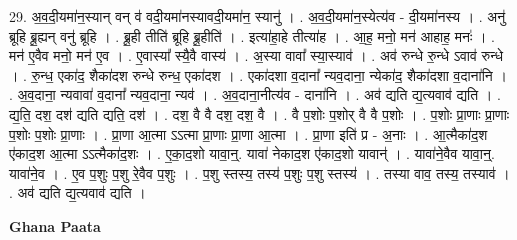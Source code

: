 \documentclass[17pt]{extarticle}
\begin{document}
29. अ॒व॒दी॒यमा॑न॒स्यान् वन् व॑ वदी॒यमा॑नस्यावदी॒यमा॑न॒ स्यानु॑ । . अ॒व॒दी॒यमा॑न॒स्येत्य॑व - दी॒यमा॑नस्य । . अनु॑ ब्रूहि ब्रू॒ह्यन् वनु॑ ब्रूहि । . ब्रू॒ही तीति॑ ब्रूहि ब्रू॒हीति॑ । . इत्या॑हा॒हे तीत्या॑ह । . आ॒ह॒ मनो॒ मन॑ आहाह॒ मनः॑ । . मन॑ ए॒वैव मनो॒ मन॑ ए॒व । . ए॒वास्या᳚ स्यै॒वै वास्य॑ । . अ॒स्या वावा᳚ स्या॒स्याव॑ । . अव॑ रुन्धे रु॒न्धे ऽवाव॑ रुन्धे । . रु॒न्ध॒ एका॑द॒ शैका॑दश रुन्धे रुन्ध॒ एका॑दश । . एका॑दशा व॒दाना᳚ न्यव॒दाना॒ न्येका॑द॒ शैका॑दशा व॒दाना॑नि । . अ॒व॒दाना॒ न्यवावा॑ व॒दाना᳚ न्यव॒दाना॒ न्यव॑ । . अ॒व॒दाना॒नीत्य॑व - दाना॑नि । . अव॑ द्यति द्य॒त्यवाव॑ द्यति । . द्य॒ति॒ दश॒ दश॑ द्यति द्यति॒ दश॑ । . दश॒ वै वै दश॒ दश॒ वै । . वै प॒शोः प॒शोर् वै वै प॒शोः । . प॒शोः प्रा॒णाः प्रा॒णाः प॒शोः प॒शोः प्रा॒णाः । . प्रा॒णा आ॒त्मा ऽऽत्मा प्रा॒णाः प्रा॒णा आ॒त्मा । . प्रा॒णा इति॑ प्र - अ॒नाः । . आ॒त्मैका॑द॒श ए॑काद॒श आ॒त्मा ऽऽत्मैका॑द॒शः । . ए॒का॒द॒शो यावा॒न्॒. यावा॑ नेकाद॒श ए॑काद॒शो यावान्॑ । . यावा॑ने॒वैव यावा॒न्॒. यावा॑ने॒व । . ए॒व प॒शुः प॒शु रे॒वैव प॒शुः । . प॒शु स्तस्य॒ तस्य॑ प॒शुः प॒शु स्तस्य॑ । . तस्या वाव॒ तस्य॒ तस्याव॑ । . अव॑ द्यति द्य॒त्यवाव॑ द्यति । \newline

\textbf{Ghana Paata } \newline
\end{document}
